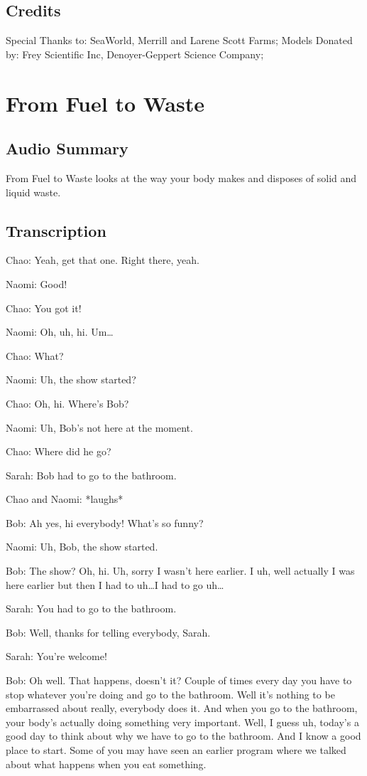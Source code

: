 \subsection{Credits}

Special Thanks to: SeaWorld, Merrill and Larene Scott Farms;
Models Donated by: Frey Scientific Inc, Denoyer-Geppert Science Company;

\section{From Fuel to Waste}

\subsection{Audio Summary}

From Fuel to Waste looks at the way your body makes and disposes of solid and liquid waste.

\subsection{Transcription}

Chao: Yeah, get that one. Right there, yeah.

Naomi: Good!

Chao: You got it!

Naomi: Oh, uh, hi. Um\dots

Chao: What?

Naomi: Uh, the show started?

Chao: Oh, hi. Where's Bob?

Naomi: Uh, Bob's not here at the moment.

Chao: Where did he go?

Sarah: Bob had to go to the bathroom.

Chao and Naomi: *laughs*

Bob: Ah yes, hi everybody! What's so funny?

Naomi: Uh, Bob, the show started.

Bob: The show? Oh, hi. Uh, sorry I wasn't here earlier. I uh, well actually I was here earlier but then I had to uh\dots I had to go uh\dots

Sarah: You had to go to the bathroom.

Bob: Well, thanks for telling everybody, Sarah.

Sarah: You're welcome!

Bob: Oh well. That happens, doesn't it? Couple of times every day you have to stop whatever you're doing and go to the bathroom. Well it's nothing to be embarrassed about really, everybody does it. And when you go to the bathroom, your body's actually doing something very important. Well, I guess uh, today's a good day to think about why we have to go to the bathroom. And I know a good place to start. Some of you may have seen an earlier program where we talked about what happens when you eat something.

